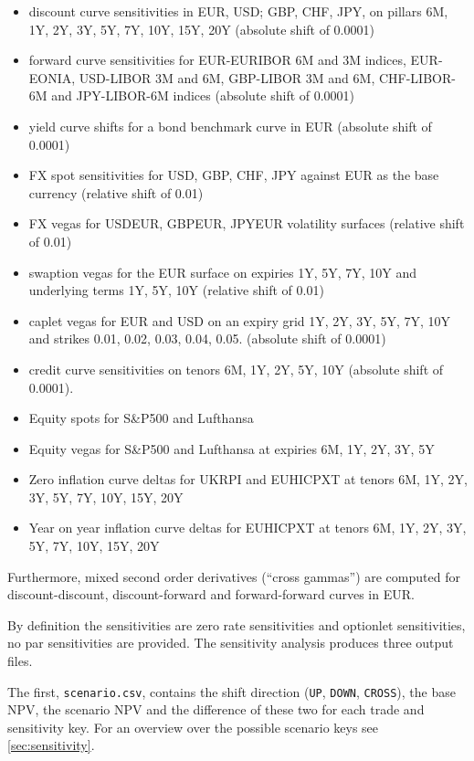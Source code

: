 \documentclass[12pt, a4paper]{article}
\begin{document}
\begin{itemize}
\item discount curve sensitivities in EUR, USD; GBP, CHF, JPY, on pillars 6M, 1Y, 2Y, 3Y, 5Y, 7Y, 10Y, 15Y, 20Y (absolute shift of 0.0001)
\item forward curve sensitivities for EUR-EURIBOR 6M and 3M indices, EUR-EONIA, USD-LIBOR 3M and 6M, GBP-LIBOR 3M and
  6M, CHF-LIBOR-6M and JPY-LIBOR-6M indices (absolute shift of 0.0001)
\item yield curve shifts for a bond benchmark curve in EUR (absolute shift of 0.0001)
\item FX spot sensitivities for USD, GBP, CHF, JPY against EUR as the base currency (relative shift of 0.01)
\item FX vegas for USDEUR, GBPEUR, JPYEUR volatility surfaces (relative shift of 0.01)
\item swaption vegas for the EUR surface on expiries 1Y, 5Y, 7Y, 10Y and underlying terms 1Y, 5Y, 10Y (relative shift of 0.01)
\item caplet vegas for EUR and USD on an expiry grid 1Y, 2Y, 3Y, 5Y, 7Y, 10Y and strikes 0.01, 0.02, 0.03, 0.04,
  0.05. (absolute shift of 0.0001)
\item credit curve sensitivities on tenors 6M, 1Y, 2Y, 5Y, 10Y (absolute shift of 0.0001).
\item Equity spots for S\&P500 and Lufthansa
\item Equity vegas for S\&P500 and Lufthansa at expiries 6M, 1Y, 2Y, 3Y, 5Y
\item Zero inflation curve deltas for UKRPI and EUHICPXT at tenors 6M, 1Y, 2Y, 3Y, 5Y, 7Y, 10Y, 15Y, 20Y
\item Year on year inflation curve deltas for EUHICPXT at tenors 6M, 1Y, 2Y, 3Y, 5Y, 7Y, 10Y, 15Y, 20Y
\end{itemize}

Furthermore, mixed second order derivatives (``cross gammas'') are computed for discount-discount, discount-forward and
forward-forward curves in EUR.

By definition the sensitivities are zero rate sensitivities and optionlet sensitivities, no par sensitivities are
provided. The sensitivity analysis produces three output files.

The first, {\tt scenario.csv}, contains the shift
direction ({\tt UP}, {\tt DOWN}, {\tt CROSS}), the base NPV, the scenario NPV and the difference of these two for each
trade and sensitivity key. For an overview over the possible scenario keys see \ref{sec:sensitivity}.
\end{document}
